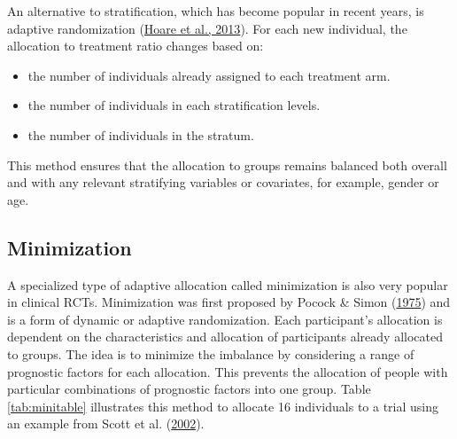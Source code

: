\documentclass{krantz}
\providecommand{\tightlist}{%
\setlength{\itemsep}{0pt}\setlength{\parskip}{0pt}}
\begin{document}
An alternative to stratification, which has become popular in recent years, is adaptive randomization (\protect\hyperlink{ref-hoare2013}{Hoare et al., 2013}). For each new individual, the allocation to treatment ratio changes based on:

\begin{itemize}
\tightlist
\item
  the number of individuals already assigned to each treatment arm.
\item
  the number of individuals in each stratification levels.
\item
  the number of individuals in the stratum.
\end{itemize}

This method ensures that the allocation to groups remains balanced both overall and with any relevant stratifying variables or covariates, for example, gender or age.

\hypertarget{minimization}{%
\subsection{Minimization}\label{minimization}}

A specialized type of adaptive allocation called minimization is also very popular in clinical RCTs. Minimization was first proposed by Pocock \& Simon (\protect\hyperlink{ref-pocock1975}{1975}) and is a form of dynamic or adaptive randomization. Each participant's allocation is dependent on the characteristics and allocation of participants already allocated to groups. The idea is to minimize the imbalance by considering a range of prognostic factors for each allocation. This prevents the allocation of people with particular combinations of prognostic factors into one group. Table \ref{tab:minitable} illustrates this method to allocate 16 individuals to a trial using an example from Scott et al. (\protect\hyperlink{ref-scott2002}{2002}).
\end{document}
